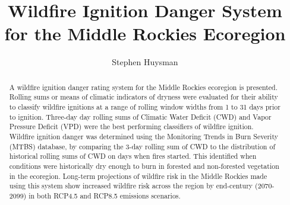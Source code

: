 \documentclass[11p]{article}
\author{Stephen Huysman}
\title{Wildfire Ignition Danger System for the Middle Rockies Ecoregion}
\begin{document}
\maketitle


\begin{abstract}
  A wildfire ignition danger rating system for the Middle Rockies
  ecoregion is presented. Rolling sums or means of climatic indicators
  of dryness were evaluated for their ability to classify wildfire
  ignitions at a range of rolling window widths from 1 to 31 days
  prior to ignition. Three-day day rolling sums of Climatic Water
  Deficit (CWD) and Vapor Pressure Deficit (VPD) were the best
  performing classifiers of wildfire ignition. Wildfire ignition
  danger was determined using the Monitoring Trends in Burn Severity
  (MTBS) database, by comparing the 3-day rolling sum of CWD to the
  distribution of historical rolling sums of CWD on days when fires
  started. This identified when conditions were historically dry
  enough to burn in forested and non-forested vegetation in the
  ecoregion. Long-term projections of wildfire risk in the Middle
  Rockies made using this system show increased wildfire risk across
  the region by end-century (2070-2099) in both RCP4.5 and RCP8.5
  emissions scenarios.
  
\end{abstract}




\end{document}

